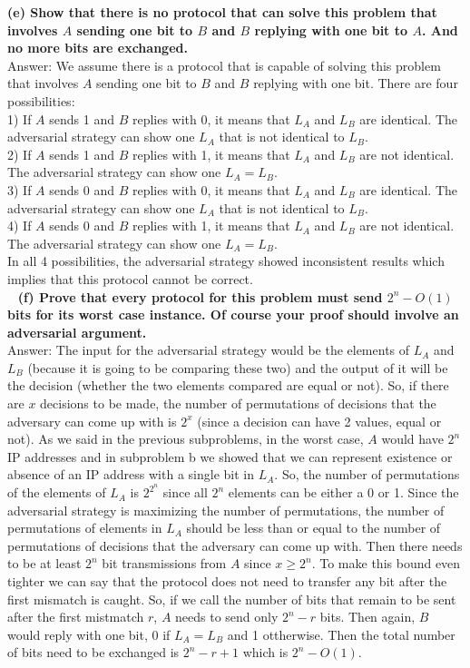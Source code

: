 \documentclass{article}
\begin{document}
\textbf{(e) Show that there is no protocol that can solve this problem that involves $A$ sending one bit to $B$ and $B$ replying with one bit to $A$. And no more bits are exchanged.} \\ \newline
Answer: We assume there is a protocol that is capable of solving this problem that involves $A$ sending one bit to $B$ and $B$ replying with one bit. There are four possibilities: \\
1) If $A$ sends 1 and $B$ replies with 0, it means that $L_A$ and $L_B$ are identical. The adversarial strategy can show one $L_A$ that is not identical to $L_B$. \\
2) If $A$ sends 1 and $B$ replies with 1, it means that $L_A$ and $L_B$ are not identical. The adversarial strategy can show one $L_A = L_B$. \\
3) If $A$ sends 0 and $B$ replies with 0, it means that $L_A$ and $L_B$ are identical. The adversarial strategy can show one $L_A$ that is not identical to $L_B$. \\
4) If $A$ sends 0 and $B$ replies with 1, it means that $L_A$ and $L_B$ are not identical. The adversarial strategy can show one $L_A = L_B$. \\
In all 4 possibilities, the adversarial strategy showed inconsistent results which implies that this protocol cannot be correct. \\ \newline
\textbf{(f) Prove that every protocol for this problem must send $2^n - O(1)$ bits for its worst case instance. Of course your proof should involve an adversarial argument.} \\ \newline
Answer: The input for the adversarial strategy would be the elements of $L_A$ and $L_B$ (because it is going to be comparing these two) and the output of it will be the decision (whether the two elements compared are equal or not). So, if there are $x$ decisions to be made, the number of permutations of decisions that the adversary can come up with is $2^x$ (since a decision can have 2 values, equal or not). As we said in the previous subproblems, in the worst case, $A$ would have $2^n$ IP addresses and in subproblem b we showed that we can represent existence or absence of an IP address with a single bit in $L_A$. So, the number of permutations of the elements of $L_A$ is $2^{2^n}$ since all $2^n$ elements can be either a 0 or 1. Since the adversarial strategy is maximizing the number of permutations, the number of permutations of elements in $L_A$ should be less than or equal to the number of permutations of decisions that the adversary can come up with. Then there needs to be at least $2^n$ bit transmissions from $A$ since $x \geq 2^n$. To make this bound even tighter we can say that the protocol does not need to transfer any bit after the first mismatch is caught. So, if we call the number of bits that remain to be sent after the first mistmatch $r$, $A$ needs to send only $2^n - r$ bits. Then again, $B$ would reply with one bit, 0 if $L_A = L_B$ and 1 ottherwise. Then the total number of bits need to be exchanged is $2^n - r + 1$ which is $2^n - O(1)$. \\ \newline
\end{document}
